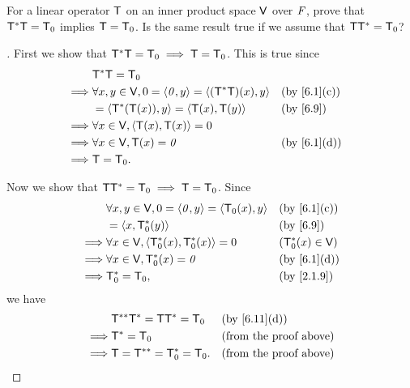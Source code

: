 \begin{ex}\label{ex:6.3.11}
  For a linear operator \(\mathsf{T}\) on an inner product space \(\mathsf{V}\) over \(\mathit{F}\), prove that \(\mathsf{T}^* \mathsf{T} = \mathsf{T}_0\) implies \(\mathsf{T} = \mathsf{T}_0\).
  Is the same result true if we assume that \(\mathsf{T} \mathsf{T}^* = \mathsf{T}_0\)?
\end{ex}

\begin{proof}[]
  First we show that \(\mathsf{T}^* \mathsf{T} = \mathsf{T}_0 \implies \mathsf{T} = \mathsf{T}_0\).
  This is true since
  \begin{align*}
             & \T^* \T = \zT                                                                  \\
    \implies & \forall x, y \in \V, 0 = \inn{\zv, y} = \inn{(\T^* \T)(x), y} &  & \by{6.1}[c] \\
             & = \inn{\T^*(\T(x)), y} = \inn{\T(x), \T(y)}                   &  & \by{6.9}    \\
    \implies & \forall x \in \V, \inn{\T(x), \T(x)} = 0                                       \\
    \implies & \forall x \in \V, \T(x) = \zv                                 &  & \by{6.1}[d] \\
    \implies & \T = \zT.
  \end{align*}

  Now we show that \(\mathsf{T} \mathsf{T}^* = \mathsf{T}_0 \implies \mathsf{T} = \mathsf{T}_0\).
  Since
  \begin{align*}
             & \forall x, y \in \V, 0 = \inn{\zv, y} = \inn{\zT(x), y} &  & \by{6.1}[c]       \\
             & = \inn{x, \zT^*(y)}                                     &  & \by{6.9}          \\
    \implies & \forall x \in \V, \inn{\zT^*(x), \zT^*(x)} = 0          &  & (\zT^*(x) \in \V) \\
    \implies & \forall x \in \V, \zT^*(x) = \zv                        &  & \by{6.1}[d]       \\
    \implies & \zT^* = \zT,                                            &  & \by{2.1.9}
  \end{align*}
  we have
  \begin{align*}
             & \T^{**} \T^* = \T \T^* = \zT &  & \by{6.11}[d]                  \\
    \implies & \T^* = \zT                   &  & \text{(from the proof above)} \\
    \implies & \T = \T^{**} = \zT^* = \zT.  &  & \text{(from the proof above)}
  \end{align*}
\end{proof}

